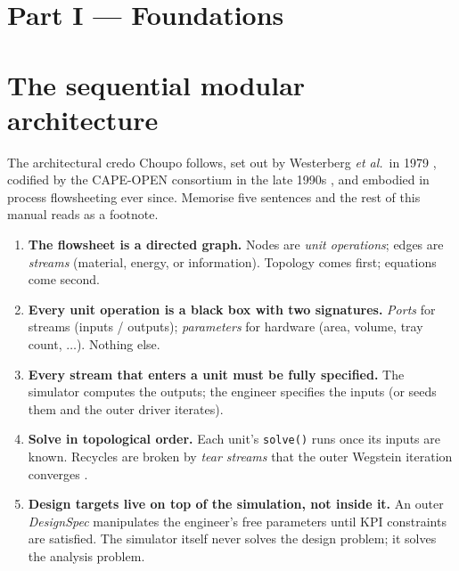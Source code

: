 \documentclass[11pt,a4paper]{article}
\begin{document}
\section*{Part I --- Foundations}
{}

\setcounter{section}{0}

\section{The sequential modular architecture}\label{ch:sm-architecture}

\begin{whatyoulllearn}
The architectural credo Choupo follows, set out by Westerberg
\emph{et al.}\ in 1979 \cite{Westerberg1979}, codified by the
CAPE-OPEN consortium in the late 1990s \cite{CapeOpen}, and embodied
in process flowsheeting ever since.  Memorise five
sentences and the rest of this manual reads as a footnote.

\begin{enumerate}[leftmargin=*,nosep,topsep=2pt]
  \item \textbf{The flowsheet is a directed graph.}  Nodes are
        \emph{unit operations}; edges are \emph{streams} (material,
        energy, or information).  Topology comes first; equations
        come second.
  \item \textbf{Every unit operation is a black box with two
        signatures.}  \emph{Ports} for streams (inputs / outputs);
        \emph{parameters} for hardware (area, volume, tray count,
        $\ldots$).  Nothing else.
  \item \textbf{Every stream that enters a unit must be fully
        specified.}  The simulator computes the outputs; the
        engineer specifies the inputs (or seeds them and the
        outer driver iterates).
  \item \textbf{Solve in topological order.}  Each unit's
        \texttt{solve()} runs once its inputs are known.  Recycles
        are broken by \emph{tear streams} that the outer
        Wegstein iteration converges \cite{Wegstein,Westerberg1979}.
  \item \textbf{Design targets live on top of the simulation,
        not inside it.}  An outer \emph{DesignSpec} manipulates the
        engineer's free parameters until KPI constraints are
        satisfied.  The simulator itself never solves the design
        problem; it solves the analysis problem.
\end{enumerate}
\end{whatyoulllearn}
\end{document}
